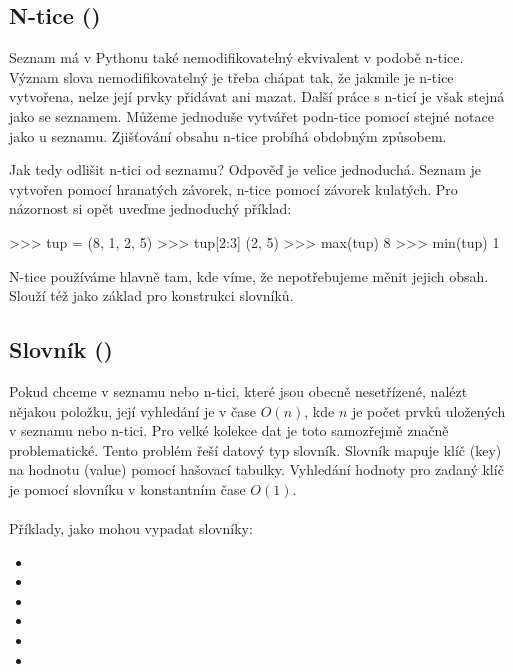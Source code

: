 \subsection{N-tice ()}

Seznam má v Pythonu také nemodifikovatelný ekvivalent v podobě n-tice. Význam slova nemodifikovatelný je třeba chápat tak, že jakmile je n-tice vytvořena, nelze její prvky přidávat ani mazat. Další práce s n-ticí je však stejná jako se seznamem. Můžeme jednoduše vytvářet podn-tice pomocí stejné notace jako u seznamu. Zjišťování obsahu n-tice probíhá obdobným způsobem.

Jak tedy odlišit n-tici od seznamu? Odpověď je velice jednoduchá. Seznam je vytvořen pomocí hranatých závorek, n-tice pomocí závorek kulatých. Pro názornost si opět uveďme jednoduchý příklad:

\begin{python}
>>> tup = (8, 1, 2, 5)
>>> tup[2:3]
(2, 5)
>>> max(tup)
8
>>> min(tup)
1
\end{python}

N-tice používáme hlavně tam, kde víme, že nepotřebujeme měnit jejich obsah. Slouží též jako základ pro konstrukci slovníků.


\subsection{Slovník ()}\label{sec:dict}

Pokud chceme v seznamu nebo n-tici, které jsou obecně nesetřízené, nalézt nějakou položku, její vyhledání je v čase $O(n)$, kde $n$ je počet prvků
uložených v seznamu nebo n-tici. Pro velké kolekce dat je toto samozřejmě značně problematické. Tento problém řeší datový typ slovník.
Slovník mapuje klíč (key) na hodnotu (value) pomocí hašovací tabulky. Vyhledání hodnoty pro zadaný klíč je pomocí slovníku v konstantním čase $O(1)$.
\\
\\
\noindent
Příklady, jako mohou vypadat slovníky:

\begin{itemize}
    \item \kod{\{\}}
    \item {}
    \item {}
    \item {}
    \item {}
    \item {}
\end{itemize}

